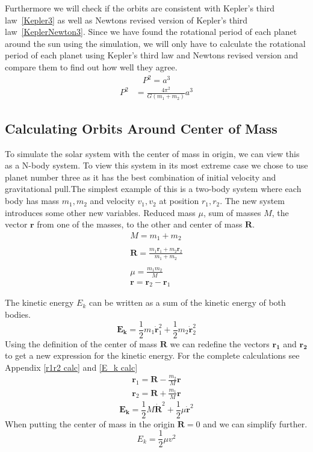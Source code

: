 \documentclass[reprint,english,notitlepage]{revtex4-2}
\begin{document}
Furthermore we will check if the orbits are consistent with Kepler's third law~\eqref{Kepler3} as well as Newtons revised version of Kepler's third law~\eqref{KeplerNewton3}.
Since we have found the rotational period of each planet around the sun using the simulation, we will only have to calculate the rotational period of each planet using Kepler's third law and Newtons revised version and compare them to find out how well they agree.
\begin{align}
    P^2 = a^3 \label{Kepler3}
\end{align}
\begin{align}
	P^2 &= \frac{4 \pi^2}{G \left( m_1 + m_2 \right)} a^3 \label{KeplerNewton3}
\end{align}

\subsection{Calculating Orbits Around Center of Mass}\label{Method orbit calc}

To simulate the solar system with the center of mass in origin, we can view this as a N-body system. To view this system in its most extreme case we chose to use planet number three as it has the best combination of initial velocity and gravitational pull.The simplest example of this is a two-body system where each body has mass $ m_1 , m_2 $ and velocity $ v_1, v_2 $ at position $ r_1, r_2 $. The new system introduces some other new variables. Reduced mass $ \mu $, sum of masses $ M $, the vector $ \mathbf{r} $ from one of the masses, to the other and center of mass $ \mathbf{R} $.
\begin{align*}
	M = m_1 + m_2 \\ \\
	\mathbf{R} = \frac{m_1 \mathbf{r}_1 + m_2  \mathbf{r}_2}{m_1 + m_2} \\ \\
	μ = \frac{m_1 m_2}{M} \\ 
	\mathbf{r} = \mathbf{r}_2 - \mathbf{r}_1
\end{align*}



The kinetic energy $ E_k $ can be written as a sum of the kinetic energy of both bodies.
\[
\mathbf{E_k} = \frac{1}{2}m_1 \mathbf{\dot{r}}_{1}^{2} + \frac{1}{2}m_2 \mathbf{\dot{r}}_{2}^{2}
\]
Using the definition of the center of mass $ \mathbf{R} $ we can redefine the vectors $ \mathbf{r_1} $ and $ \mathbf{r_2} $ to get a new expression for the kinetic energy. For the complete calculations see Appendix \ref{r1r2 calc} and \ref{E_k calc}
\begin{align}
	\mathbf{r}_1 = \mathbf{R} - \frac{m_2}{M}\mathbf{r} \label{r_1 redef} \\
	\mathbf{r}_2 = \mathbf{R} + \frac{m_1}{M}\mathbf{r} \label{r_2 redef}
\end{align}
\[
\mathbf{E_k} = \frac{1}{2}M \mathbf{\dot{R}}^{2} + \frac{1}{2}μ \mathbf{\dot{r}}^{2} 
\]
When putting the center of mass in the origin $ \mathbf{R} = 0 $ and we can simplify further. 
\[
E_k = \frac{1}{2} μ v^{2}
\]
\end{document}
